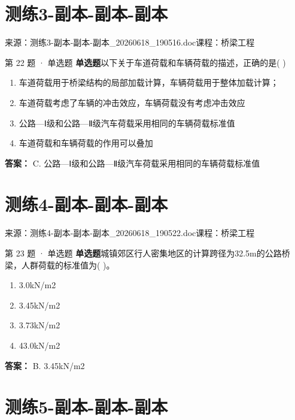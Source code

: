 \documentclass[UTF8,zihao=-4,openany]{ctexbook}
\newenvironment{choices}{\begin{enumerate}[label=\Alph*.,leftmargin=9mm,labelsep=3mm,itemsep=2pt,topsep=4pt]}{\end{enumerate}}
\newcommand{\qtype}[1]{\textcolor{brand}{\sffamily\bfseries #1}}
\newcommand{\sourcefile}[1]{\textcolor{muted}{\small\sffamily 来源：#1}}
\begin{document}
\chapter{测练3-副本-副本-副本}

\sourcefile{测练3-副本-副本-副本\_20260618\_190516.doc}\quad \textcolor{muted}{\small\sffamily 课程：桥梁工程}

\begin{questionbox}{第 22 题 · 单选题}
\qtype{单选题}\quad 以下关于车道荷载和车辆荷载的描述，正确的是( )
\begin{choices}
\item 车道荷载用于桥梁结构的局部加载计算，车辆荷载用于整体加载计算；
\item 车道荷载考虑了车辆的冲击效应，车辆荷载没有考虑冲击效应
\item 公路—Ⅰ级和公路—Ⅱ级汽车荷载采用相同的车辆荷载标准值
\item 车道荷载和车辆荷载的作用可以叠加
\end{choices}
\begin{answerbox}
\textbf{答案：} C. 公路—Ⅰ级和公路—Ⅱ级汽车荷载采用相同的车辆荷载标准值
\end{answerbox}
\end{questionbox}

\chapter{测练4-副本-副本-副本}

\sourcefile{测练4-副本-副本-副本\_20260618\_190522.doc}\quad \textcolor{muted}{\small\sffamily 课程：桥梁工程}

\begin{questionbox}{第 23 题 · 单选题}
\qtype{单选题}\quad 城镇郊区行人密集地区的计算跨径为32.5m的公路桥梁，人群荷载的标准值为( )。
\begin{choices}
\item 3.0kN/m2
\item 3.45kN/m2
\item 3.73kN/m2
\item 43.0kN/m2
\end{choices}
\begin{answerbox}
\textbf{答案：} B. 3.45kN/m2
\end{answerbox}
\end{questionbox}

\chapter{测练5-副本-副本-副本}
\end{document}
